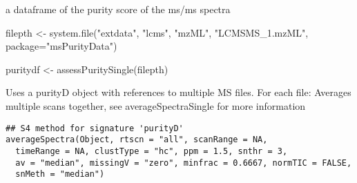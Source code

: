 \documentclass[letterpaper]{book}
\begin{document}
%
\begin{Value}
a dataframe of the purity score of the ms/ms spectra
\end{Value}
%
\begin{SeeAlso}\relax
{}
\end{SeeAlso}
%
\begin{Examples}
\begin{ExampleCode}
filepth <- system.file("extdata", "lcms", "mzML", "LCMSMS_1.mzML", package="msPurityData")

puritydf <- assessPuritySingle(filepth)
\end{ExampleCode}
\end{Examples}
%
\begin{Description}\relax
Uses a purityD object with references to multiple MS files. For each file:
Averages multiple scans together,
see averageSpectraSingle for more information
\end{Description}
%
\begin{Usage}
\begin{verbatim}
## S4 method for signature 'purityD'
averageSpectra(Object, rtscn = "all", scanRange = NA,
  timeRange = NA, clustType = "hc", ppm = 1.5, snthr = 3,
  av = "median", missingV = "zero", minfrac = 0.6667, normTIC = FALSE,
  snMeth = "median")
\end{verbatim}
\end{Usage}
%
\end{document}
